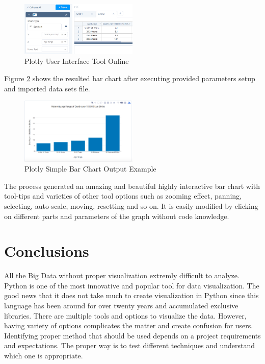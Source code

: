 \documentclass[sigconf]{acmart}
\begin{document}
\begin{figure}
  \centering
  \includegraphics[width=0.5\textwidth]{images/output_7.png}
  \caption{Plotly User Interface Tool Online } \label{fig:figure9} 
\end{figure}

Figure  \ref{fig:figure10} shows the resulted bar chart after executing provided parameters setup and imported data sets file.

\begin{figure}
  \centering
  \includegraphics[width=0.5\textwidth]{images/output_6_0.png}
  \caption{Plotly Simple Bar Chart Output Example } \label{fig:figure10} 
\end{figure}

The process generated an amazing and beautiful highly interactive bar chart with tool-tips and varieties of other tool options such as zooming effect, panning, selecting, auto-scale, moving, resetting and so on. It is easily modified by clicking on different parts and parameters of the graph without code knowledge. 


\section{Conclusions}

All the Big Data without proper visualization extremly difficult to analyze. Python is one of the most innovative and popular tool for data visualization. The good news that it does not take much to create visualization in Python since this language has been around for over twenty years and accumulated exclusive libraries. There are multiple tools and options to visualize the data. However, having variety of options complicates the matter and create confusion for users. Identifying proper method that should be used depends on a project requirements and expectations. The proper way is to test different techniques and understand which one is appropriate. 
\end{document}
